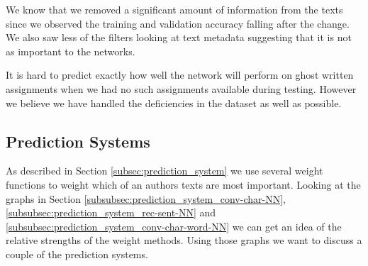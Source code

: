 We know that we removed a significant amount of information from the texts since
we observed the training and validation accuracy falling after the change. We
also saw less of the filters looking at text metadata suggesting that it is not
as important to the networks.

It is hard to predict exactly how well the network will perform on ghost written
assignments when we had no such assignments available during testing. However we
believe we have handled the deficiencies in the dataset as well as possible.


\subsection{Prediction Systems}

As described in Section \ref{subsec:prediction_system} we use several weight
functions to weight which of an authors texts are most important. Looking
at the graphs in Section \ref{subsubsec:prediction_system_conv-char-NN},
\ref{subsubsec:prediction_system_rec-sent-NN} and
\ref{subsubsec:prediction_system_conv-char-word-NN} we can get an idea of the
relative strengths of the weight methods. Using those graphs we want to discuss
a couple of the prediction systems.

